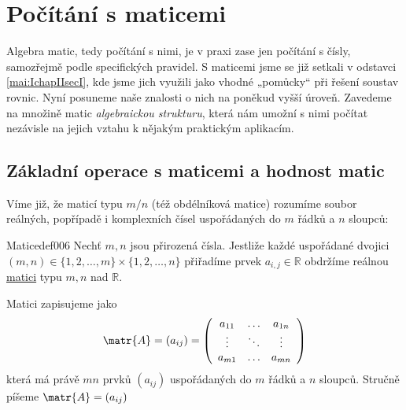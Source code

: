       

      
  \section{Počítání s maticemi}\label{mai:IchapIIsecIII}
    Algebra matic, tedy počítání s nimi, je v praxi zase jen počítání s čísly, samozřejmě podle
    specifických pravidel. S maticemi jsme se již setkali v odstavci \ref{mai:IchapIIsecI}, kde 
    jsme jich využili jako vhodné „pomůcky“ při řešení soustav rovnic. Nyní posuneme naše 
    znalosti o nich na poněkud vyšší úroveň. Zavedeme na množině matic \emph{algebraickou 
    strukturu}, která nám umožní s nimi počítat nezávisle na jejich vztahu k nějakým praktickým 
    aplikacím.
    \subsection{Základní operace s maticemi a hodnost matic}\label{mai:IchapIIsecIIIsubI}
      Víme již, že maticí typu \(m/n\) (též obdélníková matice) rozumíme soubor reálných,       
      popřípadě i komplexních čísel uspořádaných do \(m\) řádků a \(n\) sloupců:

      \begin{mathdef}{Matice}{def006}
        Nechť \(m, n\) jsou přirozená čísla. Jestliže každé uspořádané dvojici \((m,n)\in
        \{1,2,\ldots,m\}\times \{1,2,\ldots,n\}\) přiřadíme prvek \(a_{i,j}\in\mathbb{R}\) obdržíme
        reálnou \href{http://cs.wikipedia.org/wiki/Matice}{matici} typu \(m,n\) nad \(\mathbb{R}\). 
        
        Matici zapisujeme jako
        \begin{equation}\label{matice_zapis}
          \matr{A} = \left(a_{ij}\right) 
            = \left(
                \begin{array}{ccc}
                  a_{11} & \ldots & a_{1n} \\
                  \vdots & \ddots & \vdots \\
                  a_{m1} & \ldots & a_{mn}
                \end{array}
              \right)
        \end{equation}
        která má právě \(mn\) prvků \((a_{ij})\) uspořádaných do \(m\) řádků a \(n\) sloupců.
        Stručně píšeme \(\matr{A} = (a_{ij})\)
      \end{mathdef}

